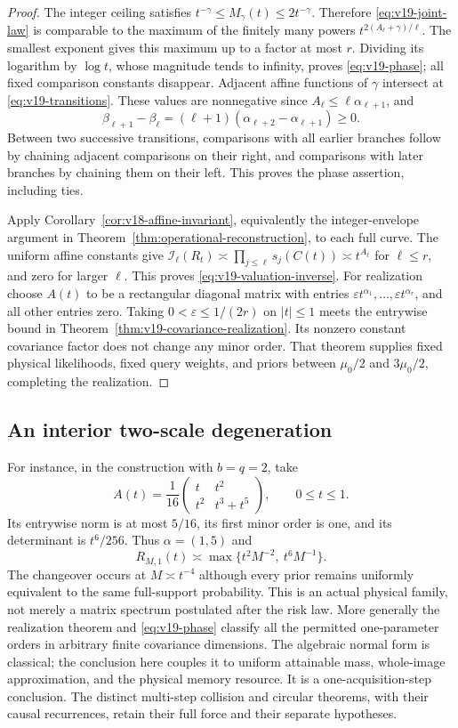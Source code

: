 \begin{proof}
The integer ceiling satisfies $t^{-\gamma}\le M_\gamma(t)
\le2t^{-\gamma}$. Therefore \eqref{eq:v19-joint-law} is comparable
to the maximum of the finitely many powers
$t^{2(A_\ell+\gamma)/\ell}$. The smallest exponent gives this
maximum up to a factor at most $r$. Dividing its logarithm by
$\log t$, whose magnitude tends to infinity, proves
\eqref{eq:v19-phase}; all fixed comparison constants disappear.
Adjacent affine functions of $\gamma$ intersect at
\eqref{eq:v19-transitions}. These values are nonnegative since
$A_\ell\le\ell\alpha_{\ell+1}$, and
\[
 \beta_{\ell+1}-\beta_\ell
       =(\ell+1)(\alpha_{\ell+2}-\alpha_{\ell+1})\ge0.
\]
Between two successive transitions, comparisons with all earlier
branches follow by chaining adjacent comparisons on their right,
and comparisons with later branches by chaining them on their left.
This proves the phase assertion, including ties.

Apply Corollary~\ref{cor:v18-affine-invariant}, equivalently the
integer-envelope argument in
Theorem~\ref{thm:operational-reconstruction}, to each full curve.
The uniform affine constants give
$\mathcal I_\ell(R_t)\asymp\prod_{j\le\ell}s_j(C(t))
\asymp t^{A_\ell}$ for $\ell\le r$, and zero for larger $\ell$.
This proves \eqref{eq:v19-valuation-inverse}. For realization choose
$A(t)$ to be a rectangular diagonal matrix with entries
$\varepsilon t^{\alpha_1},\ldots,\varepsilon t^{\alpha_r}$,
and all other entries zero. Taking $0<\varepsilon\le1/(2r)$
on $|t|\le1$ meets the entrywise bound in
Theorem~\ref{thm:v19-covariance-realization}. Its nonzero constant
covariance factor does not change any minor order. That theorem
supplies fixed physical likelihoods, fixed query weights, and priors
between $\mu_0/2$ and $3\mu_0/2$, completing the realization.
\end{proof}

\subsection{An interior two-scale degeneration}
For instance, in the construction with $b=q=2$, take
\[
 A(t)=\frac1{16}
 \begin{pmatrix}t&t^2\\t^2&t^3+t^5\end{pmatrix},
 \qquad 0\le t\le1.
\]
Its entrywise norm is at most $5/16$, its first minor order is one,
and its determinant is $t^6/256$. Thus $\alpha=(1,5)$ and
\[
 R_{M,1}(t)\asymp\max\{t^2M^{-2},\ t^6M^{-1}\}.
\]
The changeover occurs at $M\asymp t^{-4}$ although every prior
remains uniformly equivalent to the same full-support probability.
This is an actual physical family, not merely a matrix spectrum
postulated after the risk law. More generally the realization theorem
and \eqref{eq:v19-phase} classify all the permitted one-parameter
orders in arbitrary finite covariance dimensions. The algebraic
normal form is classical; the conclusion here couples it to uniform
attainable mass, whole-image approximation, and the physical memory
resource. It is a one-acquisition-step conclusion. The distinct
multi-step collision and circular theorems, with their causal
recurrences, retain their full force and their separate hypotheses.

